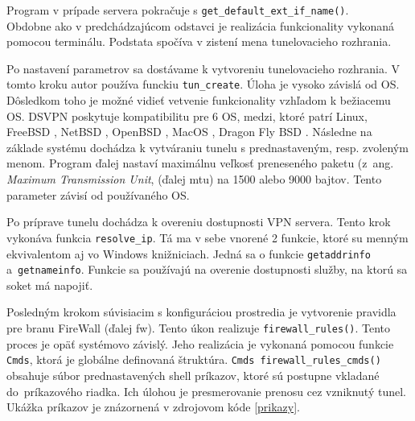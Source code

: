 Program v prípade servera pokračuje s \lstinline|get_default_ext_if_name()|. \\Obdobne ako v predchádzajúcom odstavci je realizácia funkcionality vykonaná pomocou terminálu. Podstata spočíva v zistení mena tunelovacieho rozhrania.
 
Po nastavení parametrov sa dostávame k vytvoreniu tunelovacieho rozhrania. V tomto kroku autor používa funckiu \lstinline|tun_create|. Úloha je vysoko závislá od OS. Dôsledkom toho je možné vidieť vetvenie funkcionality vzhľadom k bežiacemu OS. DSVPN poskytuje kompatibilitu pre 6 OS, medzi, ktoré patrí Linux, FreeBSD \cite{fbsd}, NetBSD \cite{netbsd}, OpenBSD \cite{obsd}, MacOS \cite{mac}, Dragon Fly BSD \cite{dfbsd}. Následne na základe systému dochádza k vytváraniu tunelu s prednastaveným, resp. zvoleným menom. Program ďalej nastaví maximálnu veľkosť preneseného paketu (z~ang. \textit{Maximum Transmission Unit}, (ďalej \acrshort{mtu}) na 1500 alebo 9000 bajtov. Tento parameter závisí od používaného OS.  
 
Po príprave tunelu dochádza k overeniu dostupnosti VPN servera. Tento krok vykonáva funkcia \lstinline|resolve_ip|. Tá ma v sebe vnorené 2 funkcie, ktoré su menným ekvivalentom aj vo Windows knižniciach. Jedná sa o funkcie \lstinline|getaddrinfo| \\a~\lstinline|getnameinfo|. Funkcie sa používajú na overenie dostupnosti služby, na ktorú sa soket má napojiť. 
 
Posledným krokom súvisiacim s konfiguráciou prostredia je vytvorenie pravidla pre branu FireWall (ďalej \acrshort{fw}). Tento úkon realizuje \lstinline|firewall_rules()|. Tento proces je opäť systémovo závislý. Jeho realizácia je vykonaná pomocou funkcie \lstinline|Cmds|, ktorá je globálne definovaná štruktúra. \lstinline|Cmds firewall_rules_cmds()| obsahuje súbor prednastavených shell príkazov, ktoré sú postupne vkladané do~príkazového riadka. Ich úlohou je presmerovanie prenosu cez vzniknutý tunel. \\Ukážka príkazov je znázornená v zdrojovom kóde \ref{prikazy}. 

